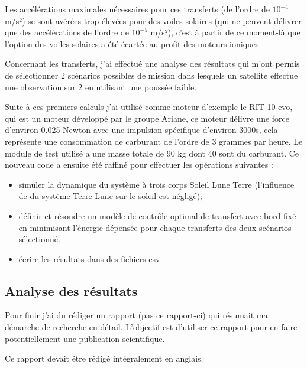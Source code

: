 \documentclass[11pt]{article} %
\begin{document}
		Les accélérations maximales nécessaires pour ces transferts (de l'ordre de $10^{-4}$ m/s²) se sont avérées trop élevées pour des voiles solaires (qui ne peuvent délivrer que des accélérations de l'ordre de $10^{-5}$ m/s²), c'est à partir de ce moment-là que l'option des voiles solaires a été écartée au profit des moteurs ioniques.	
		
		Concernant les transferts, j'ai effectué une analyse des résultats qui m'ont permis de sélectionner 2 scénarios possibles de mission dans lesquels un satellite effectue une observation sur 2 en utilisant une poussée faible.
		
		Suite à ces premiers calculs j'ai utilisé comme moteur d'exemple le RIT-10 evo, qui est un moteur développé par le groupe Ariane, ce moteur délivre une force d'environ 0.025 Newton avec une impulsion spécifique d'environ 3000s, cela représente une consommation de carburant de l'ordre de 3 grammes par heure. Le module de test utilisé a une masse totale de 90 kg dont 40 sont du carburant. Ce nouveau code a ensuite été raffiné pour effectuer les opérations suivantes : 
		
		\begin{itemize}
			\item simuler la dynamique du système à trois corps Soleil Lune Terre (l'influence de du système Terre-Lune sur le soleil est négligé);
			\item définir et résoudre un modèle de contrôle optimal de transfert avec bord fixé en minimisant l'énergie dépensée pour chaque transferts des deux scénarios sélectionné.
			\item écrire les résultats dans des fichiers csv.
		\end{itemize}
		\subsection{Analyse des résultats}
		
		Pour finir j'ai du rédiger un rapport (pas ce rapport-ci) qui résumait ma démarche de recherche en détail. L'objectif est d'utiliser ce rapport pour en faire potentiellement une publication scientifique.
		
		Ce rapport devait être rédigé intégralement en anglais. 
		
\end{document}
